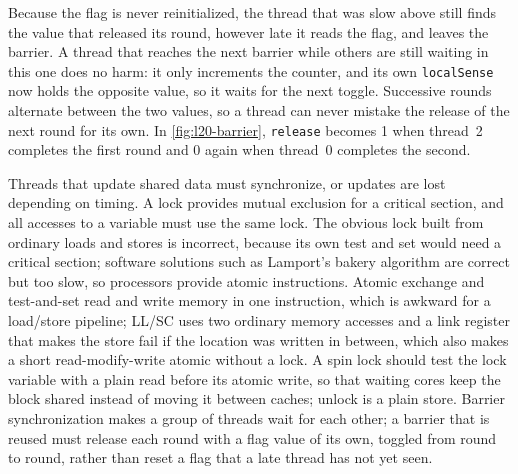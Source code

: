\documentclass[../main.tex]{subfiles}
\begin{document}
Because the flag is never reinitialized, the thread that was slow above
still finds the value that released its round, however late it reads the
flag, and leaves the barrier.  A
thread that reaches the next barrier while others are still waiting in this one
does no harm: it only increments the
counter, and its own \texttt{localSense} now holds the opposite value, so it
waits for the next toggle.  Successive rounds alternate between the two
values, so a thread can never mistake the release of the next round for its
own.  In \cref{fig:l20-barrier}, \texttt{release} becomes 1
when thread~2 completes the first round and 0 again when thread~0 completes
the second.

\begin{keypoint}
  Threads that update shared data must synchronize, or updates are lost
  depending on timing.  A lock provides mutual exclusion for a critical
  section, and all accesses to a variable must use the same lock.  The
  obvious lock built from ordinary loads and stores is incorrect, because
  its own test and set would need a critical section; software solutions
  such as Lamport's bakery algorithm are correct but too slow, so processors
  provide atomic instructions.  Atomic exchange and test-and-set read and
  write memory in one instruction, which is awkward for a load/store
  pipeline; LL/SC uses two ordinary memory accesses and a link register that
  makes the store fail if the location was written in between, which also
  makes a short read-modify-write atomic without a lock.  A spin lock should
  test the lock variable with a plain read before its atomic write, so that
  waiting cores keep the block shared instead of moving it between caches;
  unlock is a plain store.  Barrier synchronization makes a group of threads
  wait for each other; a barrier that is reused must release each round with
  a flag value of its own, toggled from round to round, rather than reset a
  flag that a late thread has not yet seen.
\end{keypoint}
\end{document}
